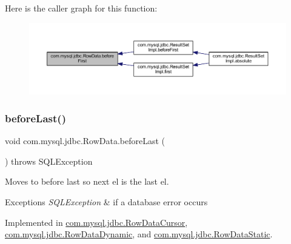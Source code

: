 Here is the caller graph for this function\+:
\nopagebreak
\begin{figure}[H]
\begin{center}
\leavevmode
\includegraphics[width=350pt]{interfacecom_1_1mysql_1_1jdbc_1_1_row_data_a3c1836b8c63ae7d859b8b0f1613ef244_icgraph}
\end{center}
\end{figure}
\mbox{\label{interfacecom_1_1mysql_1_1jdbc_1_1_row_data_a64bc800ad28a97c6ad1f7d6a4958c187}} 
\subsubsection{\texorpdfstring{before\+Last()}{beforeLast()}}
{\footnotesize\ttfamily void com.\+mysql.\+jdbc.\+Row\+Data.\+before\+Last (\begin{DoxyParamCaption}{ }\end{DoxyParamCaption}) throws S\+Q\+L\+Exception}

Moves to before last so next el is the last el.


\begin{DoxyExceptions}{Exceptions}
{\em S\+Q\+L\+Exception} & if a database error occurs \\
\hline
\end{DoxyExceptions}


Implemented in \mbox{\hyperlink{classcom_1_1mysql_1_1jdbc_1_1_row_data_cursor_ad4fae6a3882e5973545d91ff6069e92b}{com.\+mysql.\+jdbc.\+Row\+Data\+Cursor}}, \mbox{\hyperlink{classcom_1_1mysql_1_1jdbc_1_1_row_data_dynamic_a09397f78f848111ad10ddc5f75664d54}{com.\+mysql.\+jdbc.\+Row\+Data\+Dynamic}}, and \mbox{\hyperlink{classcom_1_1mysql_1_1jdbc_1_1_row_data_static_a9e4636345525191c4dfa6ac57a3a05dc}{com.\+mysql.\+jdbc.\+Row\+Data\+Static}}.

